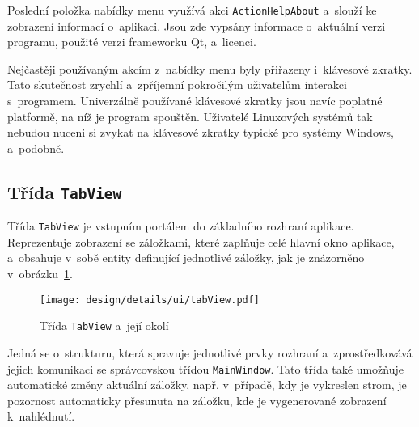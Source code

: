 		Poslední položka nabídky menu využívá akci \texttt{ActionHelpAbout} a~slouží ke zobrazení informací o~aplikaci. Jsou zde vypsány informace o~aktuální verzi programu, použité verzi frameworku Qt, a~licenci. \par
		Nejčastěji používaným akcím z~nabídky menu byly přiřazeny i~klávesové zkratky. Tato skutečnost zrychlí a~zpříjemní pokročilým uživatelům interakci s~programem. Univerzálně používané klávesové zkratky jsou navíc poplatné platformě, na níž je program spouštěn. Uživatelé Linuxových systémů tak nebudou nuceni si zvykat na klávesové zkratky typické pro systémy Windows, a~podobně. \par
		
		\subsection*{Třída \texttt{TabView}}
		Třída \texttt{TabView} je vstupním portálem do základního rozhraní aplikace. Reprezentuje zobrazení se záložkami, které zaplňuje celé hlavní okno aplikace, a~obsahuje v~sobě entity definující jednotlivé záložky, jak je znázorněno v~obrázku~\ref{fig:designDetailTabView}. \par
		\begin{figure}[h]
			\centering
			\texttt{[image: design/details/ui/tabView.pdf]}
			\caption{Třída \texttt{TabView} a~její okolí}
			\label{fig:designDetailTabView}
		\end{figure}
		Jedná se o~strukturu, která spravuje jednotlivé prvky rozhraní a~zprostředkovává jejich komunikaci se správcovskou třídou \texttt{MainWindow}. Tato třída také umožňuje automatické změny aktuální záložky, např. v~případě, kdy je vykreslen strom, je pozornost automaticky přesunuta na záložku, kde je vygenerované zobrazení k~nahlédnutí. \par
		
